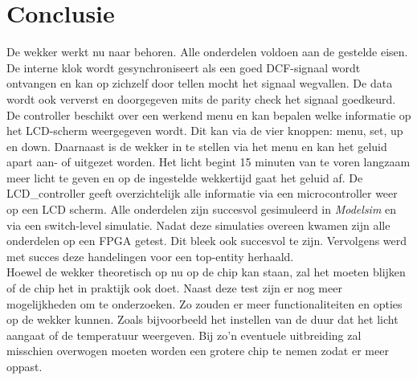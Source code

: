 \chapter{Conclusie}

De wekker werkt nu naar behoren. Alle onderdelen voldoen aan de gestelde eisen. De interne klok wordt gesynchroniseert als een goed DCF-signaal wordt ontvangen en kan op zichzelf door tellen mocht het signaal wegvallen. De data wordt ook ververst en doorgegeven mits de parity check het signaal goedkeurd. De controller beschikt over een werkend menu en kan bepalen welke informatie op het LCD-scherm weergegeven wordt. Dit kan via de vier knoppen: menu, set, up en down. Daarnaast is de wekker in te stellen via het menu en kan het geluid apart aan- of uitgezet worden. Het licht begint 15 minuten van te voren langzaam meer licht te geven en op de ingestelde wekkertijd gaat het geluid af.  De LCD\_controller geeft overzichtelijk alle informatie via een microcontroller weer op een LCD scherm.
Alle onderdelen zijn succesvol gesimuleerd in \emph{Modelsim} en via een switch-level simulatie. Nadat deze simulaties overeen kwamen zijn alle onderdelen op een FPGA getest. Dit bleek ook succesvol te zijn. Vervolgens werd met succes deze handelingen voor een top-entity herhaald.
\\
Hoewel de wekker theoretisch op nu op de chip kan staan, zal het moeten blijken of de chip het in praktijk ook doet. Naast deze test zijn er nog meer mogelijkheden om te onderzoeken. Zo zouden er meer functionaliteiten en opties op de wekker kunnen. Zoals bijvoorbeeld het instellen van de duur dat het licht aangaat of de temperatuur weergeven. Bij zo'n eventuele uitbreiding zal misschien overwogen moeten worden een grotere chip te nemen zodat er meer oppast.